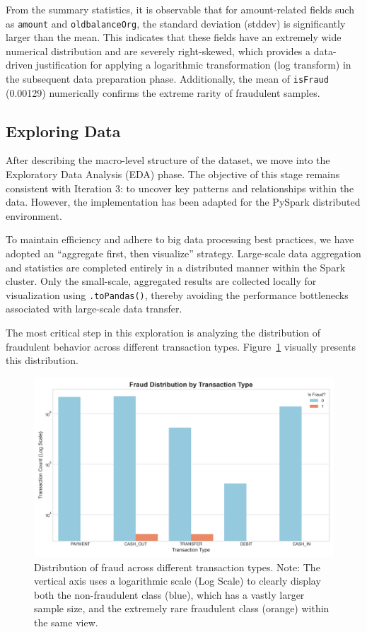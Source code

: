 \documentclass[sigplan,screen]{acmart}
\begin{document}
From the summary statistics, it is observable that for amount-related fields such as \texttt{amount} and \texttt{oldbalanceOrg}, the standard deviation (stddev) is significantly larger than the mean. This indicates that these fields have an extremely wide numerical distribution and are severely right-skewed, which provides a data-driven justification for applying a logarithmic transformation (log transform) in the subsequent data preparation phase. Additionally, the mean of \texttt{isFraud} (0.00129) numerically confirms the extreme rarity of fraudulent samples.

\subsection{Exploring Data}

After describing the macro-level structure of the dataset, we move into the Exploratory Data Analysis (EDA) phase. The objective of this stage remains consistent with Iteration 3: to uncover key patterns and relationships within the data. However, the implementation has been adapted for the PySpark distributed environment.

To maintain efficiency and adhere to big data processing best practices, we have adopted an ``aggregate first, then visualize'' strategy. Large-scale data aggregation and statistics are completed entirely in a distributed manner within the Spark cluster. Only the small-scale, aggregated results are collected locally for visualization using \texttt{.toPandas()}, thereby avoiding the performance bottlenecks associated with large-scale data transfer.

The most critical step in this exploration is analyzing the distribution of fraudulent behavior across different transaction types. Figure~\ref{fig:fraud-distribution} visually presents this distribution.

\begin{figure}[h]
  \centering
  \includegraphics[width=\linewidth]{Figure/2.3a.png}
  \caption{Distribution of fraud across different transaction types. Note: The vertical axis uses a logarithmic scale (Log Scale) to clearly display both the non-fraudulent class (blue), which has a vastly larger sample size, and the extremely rare fraudulent class (orange) within the same view.}
  \label{fig:fraud-distribution}
\end{figure}
\end{document}
